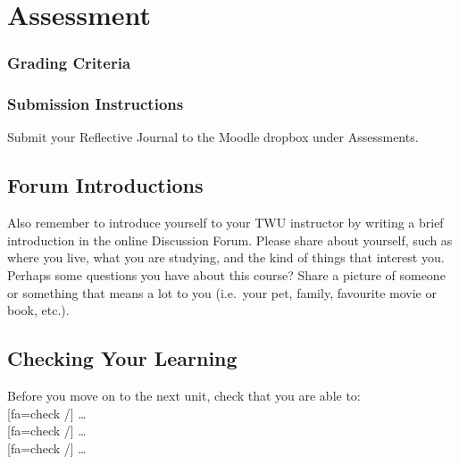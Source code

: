 \documentclass[
]{book}
\begin{document}
\hypertarget{assessment-2}{%
\section*{Assessment}\label{assessment-2}}

\hypertarget{grading-criteria-2}{%
\subsubsection*{Grading Criteria}\label{grading-criteria-2}}

\hypertarget{submission-instructions-2}{%
\subsubsection*{Submission Instructions}\label{submission-instructions-2}}

Submit your Reflective Journal to the Moodle dropbox under Assessments.

\hypertarget{forum-introductions-2}{%
\subsection*{Forum Introductions}\label{forum-introductions-2}}

Also remember to introduce yourself to your TWU instructor by writing a brief introduction in the online Discussion Forum. Please share about yourself, such as where you live, what you are studying, and the kind of things that interest you. Perhaps some questions you have about this course? Share a picture of someone or something that means a lot to you (i.e.~your pet, family, favourite movie or book, etc.).

\hypertarget{checking-your-learning-2}{%
\subsection*{Checking Your Learning}\label{checking-your-learning-2}}

\begin{progress}
Before you move on to the next unit, check that you are able to:\\
{[}fa=check /{]} \ldots{}\\
{[}fa=check /{]} \ldots{}\\
{[}fa=check /{]} \ldots{}
\end{progress}
\end{document}
